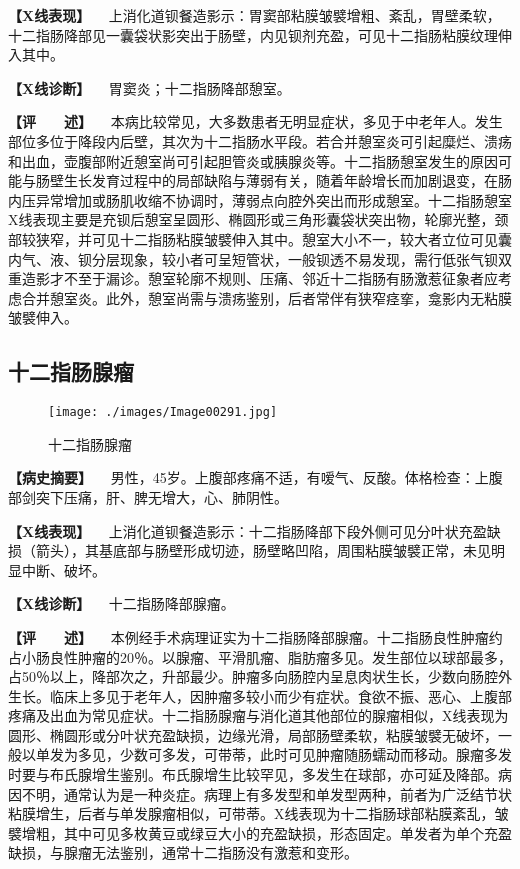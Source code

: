\textbf{【X线表现】}
　上消化道钡餐造影示：胃窦部粘膜皱襞增粗、紊乱，胃壁柔软，十二指肠降部见一囊袋状影突出于肠壁，内见钡剂充盈，可见十二指肠粘膜纹理伸入其中。

\textbf{【X线诊断】} 　胃窦炎；十二指肠降部憩室。

\textbf{【评　　述】}
　本病比较常见，大多数患者无明显症状，多见于中老年人。发生部位多位于降段内后壁，其次为十二指肠水平段。若合并憩室炎可引起糜烂、溃疡和出血，壶腹部附近憩室尚可引起胆管炎或胰腺炎等。十二指肠憩室发生的原因可能与肠壁生长发育过程中的局部缺陷与薄弱有关，随着年龄增长而加剧退变，在肠内压异常增加或肠肌收缩不协调时，薄弱点向腔外突出而形成憩室。十二指肠憩室X线表现主要是充钡后憩室呈圆形、椭圆形或三角形囊袋状突出物，轮廓光整，颈部较狭窄，并可见十二指肠粘膜皱襞伸入其中。憩室大小不一，较大者立位可见囊内气、液、钡分层现象，较小者可呈短管状，一般钡透不易发现，需行低张气钡双重造影才不至于漏诊。憩室轮廓不规则、压痛、邻近十二指肠有肠激惹征象者应考虑合并憩室炎。此外，憩室尚需与溃疡鉴别，后者常伴有狭窄痉挛，龛影内无粘膜皱襞伸入。

\subsection{十二指肠腺瘤}

\begin{figure}[!htbp]
 \centering
 \texttt{[image: ./images/Image00291.jpg]}
 \captionsetup{justification=centering}
 \caption{十二指肠腺瘤}
 \label{fig5-4-5}
  \end{figure} 

\textbf{【病史摘要】}
　男性，45岁。上腹部疼痛不适，有嗳气、反酸。体格检查：上腹部剑突下压痛，肝、脾无增大，心、肺阴性。

\textbf{【X线表现】}
　上消化道钡餐造影示：十二指肠降部下段外侧可见分叶状充盈缺损（箭头），其基底部与肠壁形成切迹，肠壁略凹陷，周围粘膜皱襞正常，未见明显中断、破坏。

\textbf{【X线诊断】} 　十二指肠降部腺瘤。

\textbf{【评　　述】}
　本例经手术病理证实为十二指肠降部腺瘤。十二指肠良性肿瘤约占小肠良性肿瘤的20％。以腺瘤、平滑肌瘤、脂肪瘤多见。发生部位以球部最多，占50％以上，降部次之，升部最少。肿瘤多向肠腔内呈息肉状生长，少数向肠腔外生长。临床上多见于老年人，因肿瘤多较小而少有症状。食欲不振、恶心、上腹部疼痛及出血为常见症状。十二指肠腺瘤与消化道其他部位的腺瘤相似，X线表现为圆形、椭圆形或分叶状充盈缺损，边缘光滑，局部肠壁柔软，粘膜皱襞无破坏，一般以单发为多见，少数可多发，可带蒂，此时可见肿瘤随肠蠕动而移动。腺瘤多发时要与布氏腺增生鉴别。布氏腺增生比较罕见，多发生在球部，亦可延及降部。病因不明，通常认为是一种炎症。病理上有多发型和单发型两种，前者为广泛结节状粘膜增生，后者与单发腺瘤相似，可带蒂。X线表现为十二指肠球部粘膜紊乱，皱襞增粗，其中可见多枚黄豆或绿豆大小的充盈缺损，形态固定。单发者为单个充盈缺损，与腺瘤无法鉴别，通常十二指肠没有激惹和变形。

